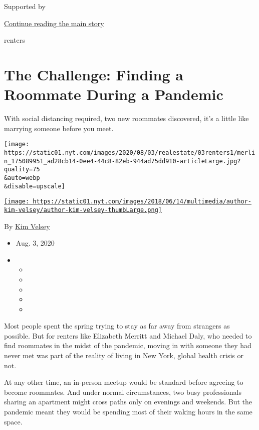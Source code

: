 Supported by

\protect\hyperlink{after-sponsor}{Continue reading the main story}

renters

\hypertarget{the-challenge-finding-a-roommate-during-a-pandemic}{%
\section{The Challenge: Finding a Roommate During a
Pandemic}\label{the-challenge-finding-a-roommate-during-a-pandemic}}

With social distancing required, two new roommates discovered, it's a
little like marrying someone before you meet.

\texttt{[image: https://static01.nyt.com/images/2020/08/03/realestate/03renters1/merlin\_175089951\_ad28cb14-0ee4-44c8-82eb-944ad75dd910-articleLarge.jpg?quality=75\\\&auto=webp\\\&disable=upscale]}

\href{https://www.nytimes.com/by/kim-velsey}{\texttt{[image: https://static01.nyt.com/images/2018/06/14/multimedia/author-kim-velsey/author-kim-velsey-thumbLarge.png]}}

By \href{https://www.nytimes.com/by/kim-velsey}{Kim Velsey}

\begin{itemize}
\item
  Aug. 3, 2020
\item
  \begin{itemize}
  \item
  \item
  \item
  \item
  \item
  \end{itemize}
\end{itemize}

Most people spent the spring trying to stay as far away from strangers
as possible. But for renters like Elizabeth Merritt and Michael Daly,
who needed to find roommates in the midst of the pandemic, moving in
with someone they had never met was part of the reality of living in New
York, global health crisis or not.

At any other time, an in-person meetup would be standard before agreeing
to become roommates. And under normal circumstances, two busy
professionals sharing an apartment might cross paths only on evenings
and weekends. But the pandemic meant they would be spending most of
their waking hours in the same space.

